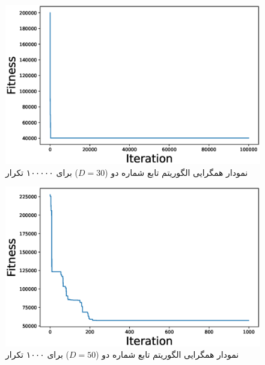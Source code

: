  \begin{figure}[H]
	\caption{نمودار همگرایی الگوریتم  تابع شماره دو ($D=30$) برای ۱۰۰۰۰۰ تکرار } 
	\centering 
	\includegraphics[width=16cm]{../Figure/Q1/PSO_II_convergence_curve_30_ite_100000} 
\end{figure}

 \begin{figure}[H]
	\caption{نمودار همگرایی الگوریتم  تابع شماره دو ($D=50$) برای ۱۰۰۰ تکرار } 
	\centering 
	\includegraphics[width=16cm]{../Figure/Q1/PSO_II_convergence_curve_50_ite_1000} 
\end{figure}


